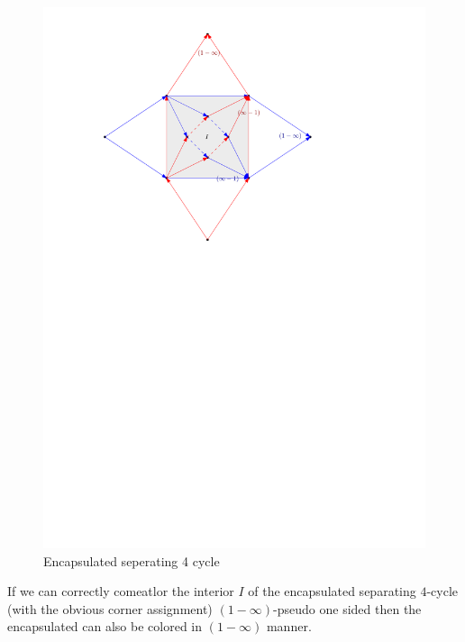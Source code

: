 \documentclass[a4paper]{article}
\theoremstyle{definition}
\begin{document}
\begin{figure}[h!]
\centering
\includegraphics[scale=1]{img/encapsulated4cycle}
\caption{Encapsulated seperating 4 cycle 
    \label{fig:}}
\end{figure}

If we can correctly comeatlor the interior $I$ of the encapsulated separating $4$-cycle (with the obvious corner assignment) $(1-\infty)$-pseudo one sided then the encapsulated can also be colored in $(1-\infty)$ manner.
\end{document}

